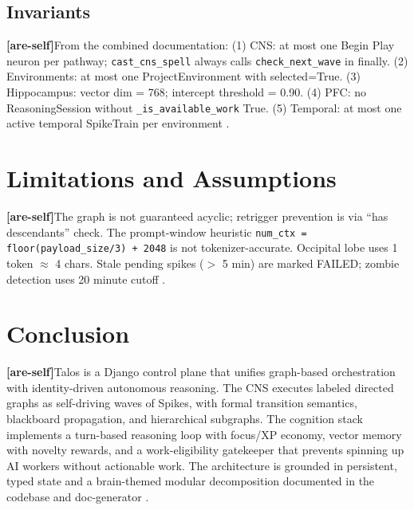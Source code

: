 \documentclass[11pt]{article}
\newcommand{\areself}{\textbf{[are-self]}}
\begin{document}
	\subsection{Invariants}
	\areself From the combined documentation: (1) CNS: at most one Begin Play neuron per pathway; \texttt{cast\_cns\_spell} always calls \texttt{check\_next\_wave} in finally. (2) Environments: at most one ProjectEnvironment with selected=True. (3) Hippocampus: vector dim = 768; intercept threshold = 0.90. (4) PFC: no ReasoningSession without \texttt{\_is\_available\_work} True. (5) Temporal: at most one active temporal SpikeTrain per environment \cite{talosCombined}.
	
	\section{Limitations and Assumptions}
	\label{are-self:limitations}
	\areself The graph is not guaranteed acyclic; retrigger prevention is via ``has descendants'' check. The prompt-window heuristic \texttt{num\_ctx = floor(payload\_size/3) + 2048} is not tokenizer-accurate. Occipital lobe uses 1 token $\approx$ 4 chars. Stale pending spikes ($>$ 5 min) are marked FAILED; zombie detection uses 20 minute cutoff \cite{talosCombined,talosCNS,talosFrontal,talosTemporal}.
	
	\section{Conclusion}
	\label{are-self:conclusion}
	\areself Talos is a Django control plane that unifies graph-based orchestration with identity-driven autonomous reasoning. The CNS executes labeled directed graphs as self-driving waves of Spikes, with formal transition semantics, blackboard propagation, and hierarchical subgraphs. The cognition stack implements a turn-based reasoning loop with focus/XP economy, vector memory with novelty rewards, and a work-eligibility gatekeeper that prevents spinning up AI workers without actionable work. The architecture is grounded in persistent, typed state and a brain-themed modular decomposition documented in the codebase and doc-generator \cite{talosLiveCodebase,talosCombined,talosCNS,talosFrontal,talosParietal,talosHippocampus,talosTemporal,talosPFC,talosIdentity}.
	
\end{document}
